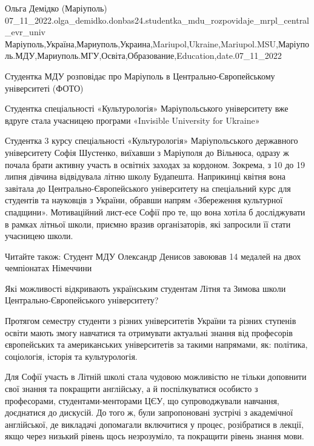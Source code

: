  
 
 
 
 

Ольга Демідко (Маріуполь)
07_11_2022.olga_demidko.donbas24.studentka_mdu_rozpovidaje_mrpl_central_evr_univ
Маріуполь,Україна,Мариуполь,Украина,Mariupol,Ukraine,Mariupol.MSU,Маріуполь.МДУ,Мариуполь.МГУ,Освіта,Образование,Education,date.07_11_2022

Студентка МДУ розповідає про Маріуполь в Центрально-Європейському університеті
(ФОТО)

Студентка спеціальності «Культурологія» Маріупольського університету вже вдруге
стала учасницею програми «Invisible University for Ukraine»

Студентка 3 курсу спеціальності «Культурологія» Маріупольського державного
університету Софія Шустенко, виїхавши з Маріуполя до Вільнюса, одразу ж почала
брати активну участь в освітніх заходах за кордоном. Зокрема, з 10 до 19 липня
дівчина відвідувала літню школу Будапешта. Наприкинці квітня вона завітала до
Центрально-Європейського університету на спеціальний курс для студентів та
науковців з України, обравши напрям «Збереження культурної спадщини».
Мотиваційний лист-есе Софії про те, що вона хотіла б досліджувати в рамках
літньої школи, приємно вразив організаторів, які запросили її стати учасницею
школи.

Читайте також: Студент МДУ Олександр Денисов завоював 14 медалей на двох
чемпіонатах Німеччини

Які можливості відкривають українським студентам Літня та Зимова школи
Центрально-Європейського університету?

Протягом семестру студенти з різних університетів України та різних ступенів
освіти мають змогу навчатися та отримувати актуальні знання від професорів
європейських та американських університетів за такими напрямами, як: політика,
соціологія, історія та культурологія.

Для Софії участь в Літній школі стала чудовою можливістю не тільки доповнити
свої знання та покращити англійську, а й поспілкуватися особисто з професорами,
студентами-менторами ЦЄУ, що супроводжували навчання, доєднатися до дискусій.
До того ж, були запропоновані зустрічі з академічної англійської, де викладачі
допомагали включитися у процес, розібратися в лекції, якщо через низький рівень
щось незрозуміло, та покращити рівень знання мови.

